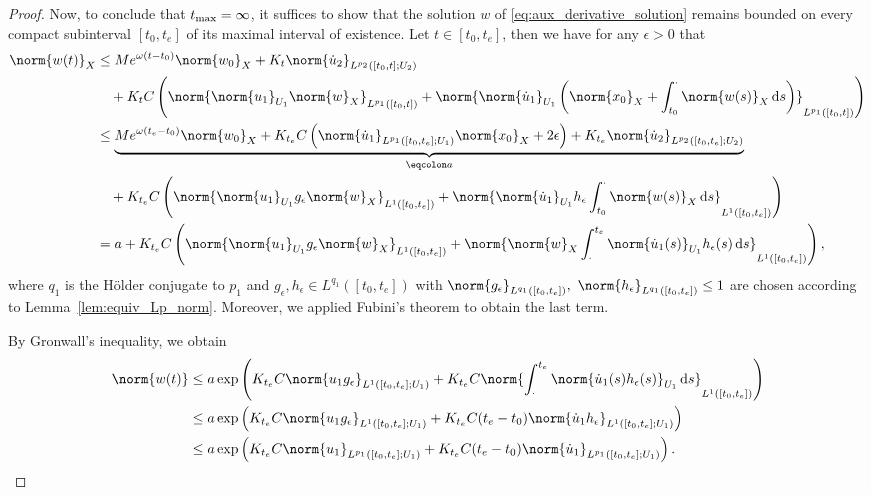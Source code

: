 \documentclass{cocv}
\newcommand{\ds}{ {\, \rm d} s}
\theoremstyle{definition}
\begin{document}
\begin{proof}
    Now, to conclude that $t_{\rm max}=\infty$, it suffices to show that the solution $w$ of \eqref{eq:aux_derivative_solution} remains bounded on every compact subinterval $[t_0, t_e]$ of its maximal interval of existence. Let $t\in [t_0,t_e]$, then we have for any $\epsilon>0$ that
    \begin{align*}
        \norm{w(t)}_X
        &\le Me^{\omega(t-t_0)} \norm{w_0}_X + K_t\norm{\dot u_2}_{L^{p_2}([t_0,t];U_2)}\\
        &\hspace{1em}+ K_t C \left(\norm{ \norm{u_1}_{U_1} \norm{w}_X}_{L^{p_1}([t_0,t])} + \norm{\norm{\dot u_1}_{U_1} \left(\norm{x_0}_X + \int_{t_0}^\cdot \norm{w(s)}_X \ds\right)}_{L^{p_1}([t_0,t])} \right)\\
        &\leq \underbrace{Me^{\omega(t_e-t_0)} \norm{w_0}_X + K_{t_e}C\left(\norm{\dot u_1}_{L^{p_1}([t_0,t_e];U_1)}\norm{x_0}_X + 2\epsilon\right) + K_{t_e}\norm{\dot u_2}_{L^{p_2}([t_0,t_e];U_2)}}_{\eqcolon a} \\
        &\hspace{1em}+ K_{t_e}C \left(\norm{\norm{u_1}_{U_1} g_\epsilon \norm{w}_X}_{L^1([t_0,t_e])} + \norm{ \norm{\dot u_1}_{U_1} h_\epsilon \int_{t_0}^\cdot \norm{w(s)}_X \ds}_{L^1([t_0,t_e])} \right)\\
        &= a + K_{t_e}C \left(\norm{\norm{u_1}_{U_1} g_\epsilon \norm{w}_X}_{L^1([t_0,t_e])} + \norm{\norm{w}_X\int^{t_e}_\cdot  \norm{\dot u_1(s)}_{U_1} h_\epsilon(s) \ds}_{L^1([t_0,t_e])} \right),
    \end{align*}
    where $q_1$ is the Hölder conjugate to $p_1$  and $g_\epsilon, h_\epsilon \in L^{q_1}([t_0, t_e])$ with $\norm{g_\epsilon}_{L^{q_1}([t_0, t_e])},$ $\norm{h_\epsilon}_{L^{q_1}([t_0, t_e])} \le 1$ are chosen according to Lemma~\ref{lem:equiv_Lp_norm}. Moreover, we applied Fubini's theorem to obtain the last term.
 
    By Gronwall's inequality, we obtain
    \begin{align*}
        \norm{w(t)} 
        &\le a \exp\left(K_{t_e}C \norm{u_1g_\epsilon}_{L^1([t_0, t_e];U_1)} + K_{t_e}C\norm{\int_{\cdot}^{t_e} \norm{\dot u_1(s) h_\epsilon(s)}_{U_1} \ds}_{L^1([t_0,t_e])} \right)\\
        &\le a \exp\left(K_{t_e}C \norm{u_1g_\epsilon}_{L^1([t_0,t_e];U_1)} + K_{t_e}C(t_e-t_0)\norm{\dot u_1 h_\epsilon}_{L^1([t_0,t_e];U_1)}\right)\\
        &\le a \exp\left(K_{t_e}C\norm{u_1}_{L^{p_1}([t_0,t_e];U_1)} + K_{t_e}C(t_e-t_0)\norm{\dot u_1}_{L^{p_1}([t_0,t_e];U_1)}\right). 
    \end{align*}
    

\end{proof}
\end{document}
